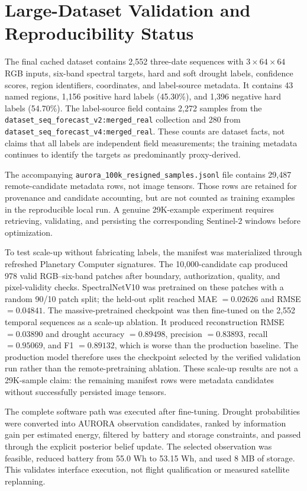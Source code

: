 \documentclass[11pt,a4paper]{article}
\begin{document}
\section{Large-Dataset Validation and Reproducibility Status}

The final cached dataset contains 2,552 three-date sequences with
$3\times64\times64$ RGB inputs, six-band spectral targets, hard and soft
drought labels, confidence scores, region identifiers, coordinates, and
label-source metadata.  It contains 43 named regions, 1,156 positive
hard labels (45.30\%), and 1,396 negative hard labels (54.70\%).  The
label-source field contains 2,272 samples from the
\texttt{dataset\_seq\_forecast\_v2:merged\_real} collection and 280 from
\texttt{dataset\_seq\_forecast\_v4:merged\_real}.  These counts are
dataset facts, not claims that all labels are independent field
measurements; the training metadata continues to identify the targets as
predominantly proxy-derived.

The accompanying
\texttt{aurora\_100k\_resigned\_samples.jsonl} file contains 29,487
remote-candidate metadata rows, not image tensors.  Those rows are retained
for provenance and candidate accounting, but are not counted as training
examples in the reproducible local run.  A genuine 29K-example experiment
requires retrieving, validating, and persisting the corresponding
Sentinel-2 windows before optimization.

To test scale-up without fabricating labels, the manifest was materialized
through refreshed Planetary Computer signatures.  The 10,000-candidate cap
produced 978 valid RGB--six-band patches after boundary, authorization,
quality, and pixel-validity checks.  SpectralNetV10 was pretrained on these
patches with a random 90/10 patch split; the held-out split reached
MAE $=0.02626$ and RMSE $=0.04841$.  The massive-pretrained checkpoint was then fine-tuned on the 2,552 temporal
sequences as a scale-up ablation.  It produced reconstruction RMSE
$=0.03890$ and drought accuracy $=0.89498$, precision $=0.83893$,
recall $=0.95069$, and F1 $=0.89132$, which is worse than the production
baseline.  The production model therefore uses the checkpoint selected by
the verified validation run rather than the remote-pretraining ablation.
These scale-up results are not a 29K-sample claim: the remaining manifest
rows were metadata candidates without successfully persisted image tensors.

The complete software path was executed after fine-tuning.  Drought
probabilities were converted into AURORA observation candidates, ranked by
information gain per estimated energy, filtered by battery and storage
constraints, and passed through the explicit posterior belief update.  The
selected observation was feasible, reduced battery from 55.0 Wh to
53.15 Wh, and used 8 MB of storage.  This validates interface execution,
not flight qualification or measured satellite replanning.
\end{document}
